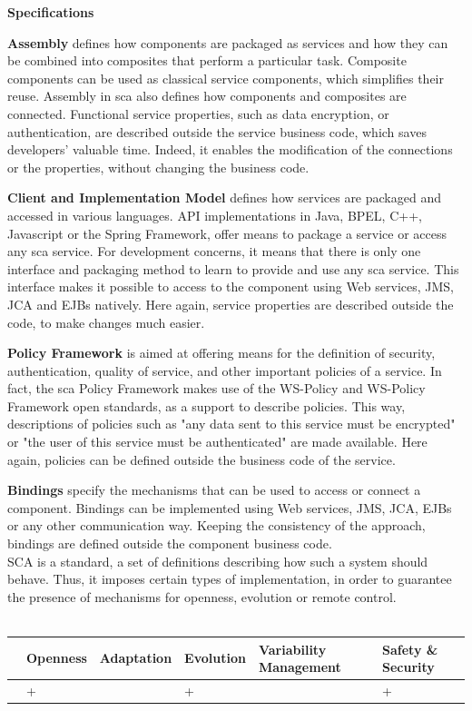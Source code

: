 {\bf Specifications}\\
\par {\bf Assembly} defines how components are packaged as services and how they can be combined into composites that perform a particular task.
Composite components can be used as classical service components, which simplifies their reuse. Assembly in \gls{sca} also defines how components and composites are connected. Functional service properties, such as data encryption, or authentication, are described outside the service business code, which saves developers' valuable time. Indeed, it enables the modification of the connections or the properties, without changing the business code.
\par {\bf Client and Implementation Model} defines how services are packaged and accessed in various languages. API implementations in Java, BPEL, C++, Javascript or the Spring Framework, offer means to package a service or access any \gls{sca} service. For development concerns, it means that there is only one interface and packaging method to learn to provide and use any \gls{sca} service. This interface makes it possible to access to the component using Web services, JMS, JCA and EJBs natively. Here again, service properties are described outside the code, to make changes much easier.
\par {\bf Policy Framework} is aimed at offering means for the definition of security, authentication, quality of service, and other important policies of a service. In fact, the \gls{sca} Policy Framework makes use of the WS-Policy and WS-Policy Framework open standards, as a support to describe policies. This way, descriptions of policies such as "any data sent to this service must be encrypted" or "the user of this service must be authenticated" are made available. Here again, policies can be defined outside the business code of the service.
\par {\bf Bindings} specify the mechanisms that can be used to access or connect a component. Bindings can be implemented using Web services, JMS, JCA, EJBs or any other communication way. Keeping the consistency of the approach, bindings are defined outside the component business code.\\

SCA is a standard, a set of definitions describing how such a system should behave. Thus, it imposes certain types of implementation, in order to guarantee the presence of mechanisms for openness, evolution or remote control.\\
\\
\begin{tabular}{ >{\centering}m{}| >{\centering}m{} >{\centering}m{}| >{\centering}m{} >{\centering}m{}| >{\centering\arraybackslash}m{}}
{\tiny Interoperability} & {\tiny Openness} & {\tiny Adaptation} & {\tiny Evolution} & {\tiny Variability Management} & {\tiny Safety \& Security}\\
 \hline
  & + &  & + &  & + \\ 
  \hline
\end{tabular}\\


